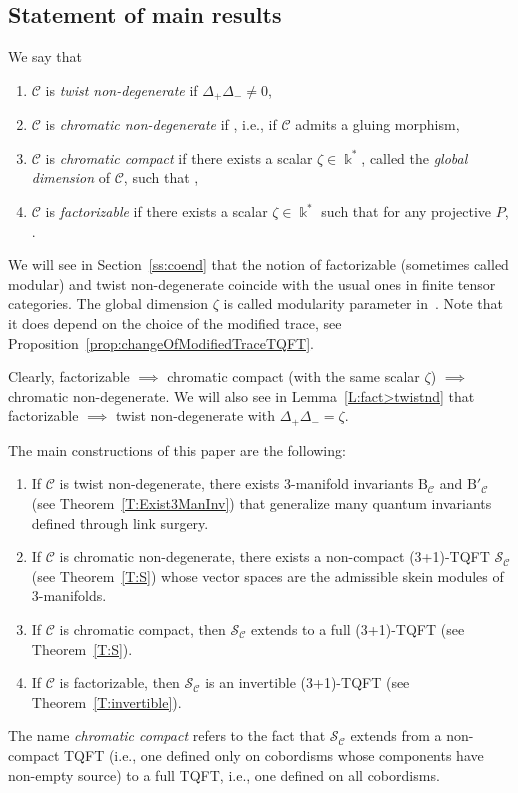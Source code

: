 \documentclass[10pt,a4paper]{amsart}
\numberwithin{equation}{section}
\numberwithin{theorem}{section}
\numberwithin{proposition}{section}
\numberwithin{definition}{section}
\numberwithin{lemma}{section}
\numberwithin{corollary}{section}
\numberwithin{remark}{section}
\numberwithin{example}{section}
\newcommand{\cat}{\mathcal{C}}
\newcommand{\unit}{\ensuremath{\mathds{1}}}
\newcommand{\FK}{{\Bbbk}}
\newcommand{\TSkein}{{\mathscr{S}}}
\newcommand{\ThreeManInv}{\mathrm{B}}
\begin{document}
\subsection{Statement of main results}
\begin{definition}\label{def:maindef}
 We say that
 \begin{enumerate}\itemsep=0pt
 \item $\cat$ is \emph{twist non-degenerate} if
 $\Delta_+\Delta_-\neq0$,
 \item $\cat$ is \emph{chromatic non-degenerate} if
 \smash{$\Delta_0^{P_\unit}\neq0$}, i.e., if $\cat$ admits a gluing
 morphism,
 \item $\cat$ is \emph{chromatic compact} if there exists a scalar
 $\zeta\in\FK^*$, called the \emph{global dimension} of $\cat$, such that
 \smash{$\Delta_0^{P_\unit}=\zeta\Lambda_{P_\unit}$},
 \item $\cat$ is \emph{factorizable} if there exists a scalar
 $\zeta\in\FK^*$ such that for any projective $P$,
 .
 \end{enumerate}
\end{definition}
We will see in Section~\ref{ss:coend} that the notion of factorizable (sometimes called modular)
and twist non-degenerate coincide with the usual ones in finite tensor
categories. The global dimension $\zeta$ is called modularity parameter in~\cite{DRGGPMR2022}. Note that it does depend on the choice of the modified trace, see Proposition~\ref{prop:changeOfModifiedTraceTQFT}.


Clearly, factorizable
$\implies$ chromatic compact (with the same
scalar $\zeta$) $\implies$ chromatic non-degenerate. We will also see in Lemma~\ref{L:fact>twistnd}
that factorizable
$\implies$ twist non-degenerate with
$\Delta_+\Delta_-=\zeta$.

The main constructions of this paper are the following:
\begin{enumerate}\itemsep=0pt
\item If $\cat$ is twist non-degenerate, there exists 3-manifold
 invariants $\ThreeManInv_\cat$ and $\ThreeManInv'_\cat$ (see Theorem~\ref{T:Exist3ManInv})
 that generalize many quantum invariants defined
 through link surgery.
\item If $\cat$ is chromatic non-degenerate, there exists a non-compact (3+1)-TQFT $\TSkein_\cat$ (see Theorem~\ref{T:S}) whose vector
 spaces are the admissible skein modules of 3-manifolds.
\item If
$\cat$ is chromatic compact, then $\TSkein_\cat$ extends to a full (3+1)-TQFT (see Theorem~\ref{T:S}).
\item If $\cat$ is factorizable, then $\TSkein_\cat$ is an invertible
 (3+1)-TQFT (see Theorem~\ref{T:invertible}).
\end{enumerate}
\begin{remark}
The name \emph{chromatic compact} refers to the fact that $\TSkein_\cat$ extends from a non-compact TQFT (i.e., one defined only
on
 cobordisms whose components have non-empty source) to a
full TQFT, i.e., one defined
on all cobordisms.
\end{remark}
\end{document}
